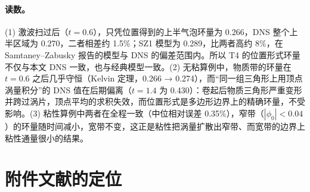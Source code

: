 \paragraph{读数。}(1) 激波扫过后（$t=0.6$），只凭位置得到的上半气泡环量为 0.266，DNS 整个上半区域为 0.270，二者相差约 1.5\%；SZ1 模型为 0.289，比两者高约 8\%，在 Samtaney–Zabusky 报告的模型与 DNS 的偏差范围内。所以 T4 的位置形式环量不仅与本文 DNS 一致，也与经典模型一致。(2) 无粘算例中，物质带的环量在 $t=0.6$ 之后几乎守恒（Kelvin 定理，0.266 → 0.274），而“同一组三角形上用顶点涡量积分”的 DNS 值在后期偏离（$t=1.4$ 为 0.430）：卷起后物质三角形严重变形并跨过涡片，顶点平均的求积失效，而位置形式是多边形边界上的精确环量，不受影响。(3) 粘性算例中两者在全程一致（中位相对误差 0.35\%），窄带（$|\phi_0|<0.04$）的环量随时间减小，宽带不变，这正是粘性把涡量扩散出窄带、而宽带的边界上粘性通量很小的结果。
\section{附件文献的定位}\label{pC:sec:lit}
